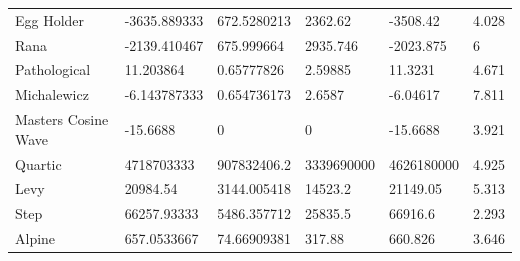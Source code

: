 \documentclass[12pt]{article}
\begin{document}
\begin{table}
\begin{tabular}{llllll}
			Egg Holder              & -3635.889333     & 672.5280213       & 2362.62        & -3508.42        & 4.028          \\
			Rana                    & -2139.410467     & 675.999664        & 2935.746       & -2023.875       & 6              \\
			Pathological            & 11.203864        & 0.65777826        & 2.59885        & 11.3231         & 4.671          \\
			Michalewicz             & -6.143787333     & 0.654736173       & 2.6587         & -6.04617        & 7.811          \\
			Masters Cosine Wave  & -15.6688         & 0                 & 0              & -15.6688        & 3.921          \\
			Quartic                 & 4718703333       & 907832406.2       & 3339690000     & 4626180000      & 4.925          \\
			Levy                    & 20984.54         & 3144.005418       & 14523.2        & 21149.05        & 5.313          \\
			Step                    & 66257.93333      & 5486.357712       & 25835.5        & 66916.6         & 2.293          \\
			Alpine                  & 657.0533667      & 74.66909381       & 317.88         & 660.826         & 3.646          \\
			\hline
		\end{tabular}
	\end{table}

\newpage
\end{document}
